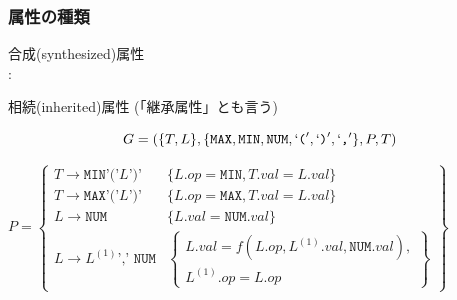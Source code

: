 \documentclass[dvipdfmx]{beamer}
\begin{document}
\begin{frame}
 \frametitle{属性の種類}

 \begin{list}{}{}
  \item 合成(synthesized)属性\\
	:
  \item 相続(inherited)属性 (「継承属性」とも言う)\\
 \end{list}


 \[G=(\{T,L\},\{\texttt{MAX},\texttt{MIN},\texttt{NUM},`\texttt{(}',`\texttt{)}',`\texttt{,}'\},P,T)\]


\vspace*{5pt}

{\small

$P=\left\{\begin{array}{ll}
  T\rightarrow\texttt{MIN'('}L\texttt{')'} & \{L.op=\texttt{MIN},T.val=L.val\}\\
  T\rightarrow\texttt{MAX'('}L\texttt{')'} & \{L.op=\texttt{MAX},T.val=L.val\}\\
  L\rightarrow\texttt{NUM} & \{L.val=\texttt{NUM}.val\}\\
  L\rightarrow L^{(1)}\texttt{',' NUM} & \left\{\begin{array}{l}L.val=f(L.op,L^{(1)}.val,\texttt{NUM}.val),\\
    L^{(1)}.op=L.op\end{array}\right\}
\end{array}\right\}$
 }
\end{frame}
\end{document}
